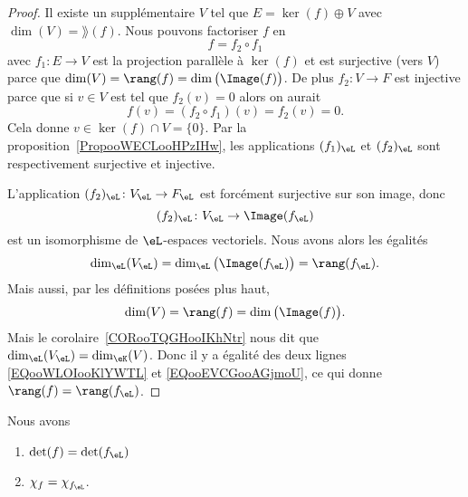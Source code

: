 \begin{proof}
	Il existe un supplémentaire \( V\) tel que \( E=\ker(f)\oplus V\) avec \( \dim(V)=\rang(f)\). Nous pouvons factoriser \( f\) en
	\begin{equation}
		f=f_2\circ f_1
	\end{equation}
	avec \( f_1\colon E\to V\) est la projection parallèle à \( \ker(f)\) et est surjective (vers \( V\)) parce que \( \dim(V)=\rang(f)=\dim\big( \Image(f) \big)\). De plus \( f_2\colon V\to F\) est injective parce que si \( v\in V\) est tel que \( f_2(v)=0\) alors on aurait
	\begin{equation}
		f(v)=(f_2\circ f_1)(v)=f_2(v)=0.
	\end{equation}
	Cela donne \( v\in\ker(f)\cap V=\{ 0 \}\). Par la proposition~\ref{PropooWECLooHPzIHw}, les applications \( (f_1)_{\eL}\) et \( (f_2)_{\eL}\) sont respectivement surjective et injective.

	L'application \( (f_2)_{\eL}\colon V_{\eL}\to F_{\eL}\) est forcément surjective sur son image, donc
	\begin{equation}
		(f_2)_{\eL}\colon V_{\eL}\to \Image(f_{\eL})
	\end{equation}
	est un isomorphisme de \( \eL\)-espaces vectoriels. Nous avons alors les égalités
	\begin{equation}        \label{EQooWLOIooKlYWTL}
		\dim_{\eL}(V_{\eL})=\dim_{\eL}\big( \Image(f_{\eL}) \big)=\rang(f_{\eL}).
	\end{equation}
	Mais aussi, par les définitions posées plus haut,
	\begin{equation}        \label{EQooEVCGooAGjmoU}
		\dim(V)=\rang(f)=\dim\big( \Image(f) \big).
	\end{equation}
	Mais le corolaire~\ref{CORooTQGHooIKhNtr} nous dit que \( \dim_{\eL}(V_{\eL})=\dim_{\eK}(V)\). Donc il y a égalité des deux lignes \eqref{EQooWLOIooKlYWTL} et \eqref{EQooEVCGooAGjmoU}, ce qui donne \( \rang(f)=\rang(f_{\eL})\).
\end{proof}

\begin{proposition}     \label{PROPooZAZFooUFdCUv}
	Nous avons
	\begin{enumerate}
		\item
		      \( \det(f)=\det(f_{\eL})\)
		\item
		      \( \chi_f=\chi_{f_{\eL}}\).
	\end{enumerate}
\end{proposition}

